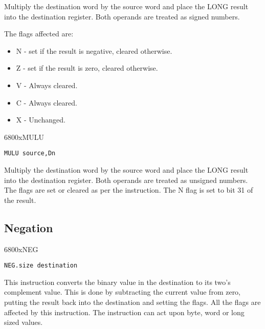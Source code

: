 Multiply the destination word by the source word and place the
      LONG result into the destination register. Both operands are treated as
      signed numbers.

The flags affected are:
\begin{itemize}[itemsep=0pt]

\item{}N -{} set if the result is negative, cleared otherwise.


\item{}Z -{} set if the result is zero, cleared otherwise.


\item{}V -{} Always cleared.


\item{}C -{} Always cleared.


\item{}X -{} Unchanged.

\end{itemize}

\mc6800x{MULU}
\begin{lstlisting}[firstnumber=1,]
          MULU source,Dn
\end{lstlisting}

Multiply the destination word by the source word and place the
      LONG result into the destination register. Both operands are treated as
      unsigned numbers. The flags are set or cleared as per the 
      instruction. The N flag is set to bit 31 of the result.

\subsection{Negation}\mc6800x{NEG}
\label{ch3-negation}%

\begin{lstlisting}[firstnumber=1,]
          NEG.size destination
\end{lstlisting}

This instruction converts the binary value in the destination to
      its two's complement value. This is done by subtracting the current
      value from zero, putting the result back into the destination and setting
      the flags. All the flags are affected by this instruction. The
      instruction can act upon byte, word or long sized values.

